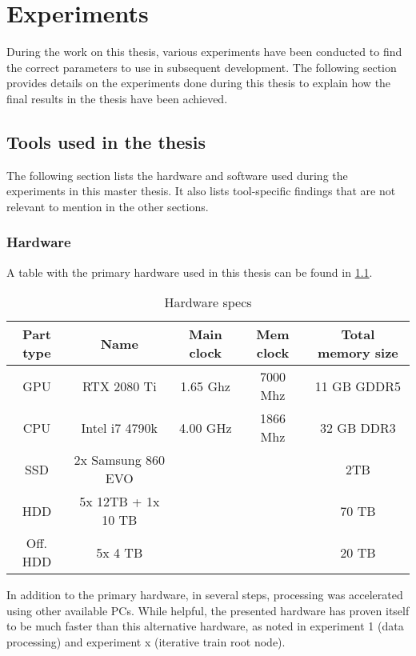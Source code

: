\chapter{Experiments}

During the work on this thesis, various experiments have been conducted to find the correct parameters to use in subsequent development.
The following section provides details on the experiments done during this thesis to explain how the final results in the thesis have been achieved.



\section{Tools used in the thesis}
The following section lists the hardware and software used during the experiments in this master thesis.
It also lists tool-specific findings that are not relevant to mention in the other sections.

\subsection{Hardware}

A table with the primary hardware used in this thesis can be found in \cref{tab:hardware}.

\begin{table}[ht]
    \centering
    \begin{tabular}{|c|c|c|c|c|}
        \hline
        Part type & Name & Main clock & Mem clock & Total memory size\\ \hline
        GPU & RTX 2080 Ti & 1.65 Ghz & 7000 Mhz & 11 GB GDDR5\\ \hline
        CPU & Intel i7 4790k & 4.00 GHz & 1866 Mhz & 32 GB DDR3\\ \hline
        SSD & 2x Samsung 860 EVO & & & 2TB \\ \hline
        HDD & 5x 12TB + 1x 10 TB & & & 70 TB \\ \hline
        Off. HDD & 5x 4 TB & & & 20 TB \\ \hline
        
    \end{tabular}
    \caption{Hardware specs}
    \label{tab:hardware}
\end{table}

In addition to the primary hardware, in several steps, processing was accelerated using other available PCs.
While helpful, the presented hardware has proven itself to be much faster than this alternative hardware, as noted in experiment 1 (data processing) and experiment x (iterative train root node). %

